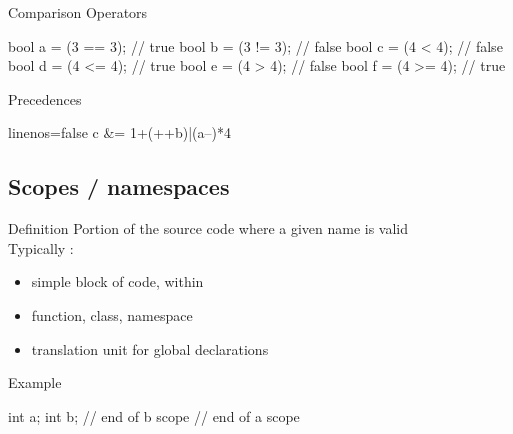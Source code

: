 \begin{frame}[fragile]
  \begin{block}{Comparison Operators}
    \begin{cppcode*}{}
      bool a = (3 == 3);  // true
      bool b = (3 != 3);  // false
      bool c = (4 <  4);  // false
      bool d = (4 <= 4);  // true
      bool e = (4 >  4);  // false
      bool f = (4 >= 4);  // true
    \end{cppcode*}
  \end{block}
  \pause
  \begin{block}{Precedences }
    \begin{cppcode*}{linenos=false}
      c &= 1+(++b)|(a--)*4%
    \end{cppcode*}
  \end{block}
\end{frame}

\subsection[NS]{Scopes / namespaces}

\begin{frame}[fragile]
  \begin{block}{Definition}
    Portion of the source code where a given name is valid \\
    Typically :
    \begin{itemize}
    \item simple block of code, within \texttt{{}}
    \item function, class, namespace
    \item translation unit for global declarations
    \end{itemize}
  \end{block}
  \begin{exampleblock}{Example}
    \begin{cppcode*}{}
      { int a;
        { int b;
        } // end of b scope
      } // end of a scope
    \end{cppcode*}
  \end{exampleblock}
\end{frame}

